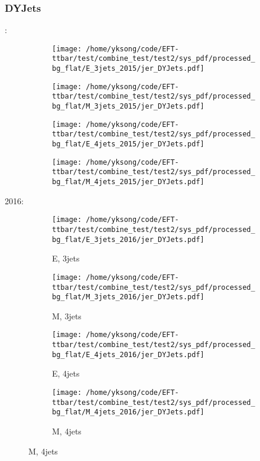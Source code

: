 \documentclass{beamer}
\begin{document}
\begin{frame}
\frametitle{DYJets}
\fontsize{5}{1}:
\begin{figure}
\centering
\begin{subfigure}[b]{0.24\textwidth}
\texttt{[image: /home/yksong/code/EFT-ttbar/test/combine\_test/test2/sys\_pdf/processed\_bg\_flat/E\_3jets\_2015/jer\_DYJets.pdf]}
\end{subfigure}
\begin{subfigure}[b]{0.24\textwidth}
\texttt{[image: /home/yksong/code/EFT-ttbar/test/combine\_test/test2/sys\_pdf/processed\_bg\_flat/M\_3jets\_2015/jer\_DYJets.pdf]}
\end{subfigure}
\begin{subfigure}[b]{0.24\textwidth}
\texttt{[image: /home/yksong/code/EFT-ttbar/test/combine\_test/test2/sys\_pdf/processed\_bg\_flat/E\_4jets\_2015/jer\_DYJets.pdf]}
\end{subfigure}
\begin{subfigure}[b]{0.24\textwidth}
\texttt{[image: /home/yksong/code/EFT-ttbar/test/combine\_test/test2/sys\_pdf/processed\_bg\_flat/M\_4jets\_2015/jer\_DYJets.pdf]}
\end{subfigure}
\end{figure}
2016:
\begin{figure}
\centering
\begin{subfigure}[b]{0.24\textwidth}
\texttt{[image: /home/yksong/code/EFT-ttbar/test/combine\_test/test2/sys\_pdf/processed\_bg\_flat/E\_3jets\_2016/jer\_DYJets.pdf]}
\captionsetup{font=tiny}
\caption{E, 3jets}
\end{subfigure}
\begin{subfigure}[b]{0.24\textwidth}
\texttt{[image: /home/yksong/code/EFT-ttbar/test/combine\_test/test2/sys\_pdf/processed\_bg\_flat/M\_3jets\_2016/jer\_DYJets.pdf]}
\captionsetup{font=tiny}
\caption{M, 3jets}
\end{subfigure}
\begin{subfigure}[b]{0.24\textwidth}
\texttt{[image: /home/yksong/code/EFT-ttbar/test/combine\_test/test2/sys\_pdf/processed\_bg\_flat/E\_4jets\_2016/jer\_DYJets.pdf]}
\captionsetup{font=tiny}
\caption{E, 4jets}
\end{subfigure}
\begin{subfigure}[b]{0.24\textwidth}
\texttt{[image: /home/yksong/code/EFT-ttbar/test/combine\_test/test2/sys\_pdf/processed\_bg\_flat/M\_4jets\_2016/jer\_DYJets.pdf]}
\captionsetup{font=tiny}
\caption{M, 4jets}
\end{subfigure}
\end{figure}
\end{frame}
\end{document}
